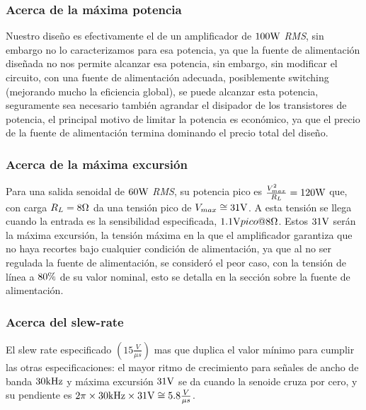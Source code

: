 \subsubsection{Acerca de la máxima potencia}
 
\begin{sloppypar}
 
Nuestro diseño es efectivamente el de un amplificador de ${100 \si[per-mode=symbol]{\watt}}$ \textit{RMS}, sin embargo no lo caracterizamos para esa potencia, ya que la fuente de alimentación diseñada no nos permite alcanzar esa potencia, sin embargo, sin modificar el circuito, con una fuente de alimentación adecuada, posiblemente switching (mejorando mucho la eficiencia global), se puede alcanzar esta potencia, seguramente sea necesario también agrandar el disipador de los transistores de potencia, el principal motivo de limitar la potencia es económico, ya que el precio de la fuente de alimentación termina dominando el precio total del diseño.

\end{sloppypar}

 
\subsubsection{Acerca de la máxima excursión}
 
 \begin{sloppypar}
 
Para una salida senoidal de $60\si[per-mode=symbol]{\watt}$ \textit{RMS}, su potencia pico es ${\frac{V_{max}^2}{R_L} = 120\si[per-mode=symbol]{\watt}}$ que, con carga ${R_L=8\si[per-mode=symbol]{\ohm}}$ da una tensión pico de ${V_{max} \cong 31 \si[per-mode=symbol]{\volt}}$. A esta tensión se llega cuando la entrada es la sensibilidad especificada, ${1.1\si[per-mode=symbol]{\volt} pico @8\si[per-mode=symbol]{\ohm}}$. Estos ${31 \si[per-mode=symbol]{\volt}}$ serán la máxima excursión, la tensión máxima en la que el amplificador garantiza que no haya recortes bajo cualquier condición de alimentación, ya que al no ser regulada la fuente de alimentación, se consideró el peor caso, con la tensión de línea a ${80\si[per-mode=symbol]{\percent}}$ de su valor nominal, esto se detalla en la sección sobre la fuente de alimentación.

\end{sloppypar}


\subsubsection{Acerca del slew-rate}

\begin{sloppypar}

El slew rate especificado ${\left(15\frac{V}{\mu s}\right)}$ mas que duplica el valor mínimo para cumplir las otras especificaciones: el mayor ritmo de crecimiento para señales de ancho de banda $30\si[per-mode=symbol]{\kilo\hertz}$ y máxima excursión $31\si[per-mode=symbol]{\volt}$ se da cuando la senoide cruza por cero, y su pendiente es ${2 \pi \times 30\si[per-mode=symbol]{\kilo\hertz}\times 31\si[per-mode=symbol]{\volt} \cong 5.8\frac{V}{\mu s}}$. 

\end{sloppypar}